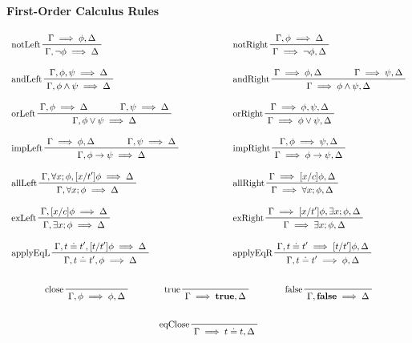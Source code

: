 			\paragraph{First-Order Calculus Rules}
				\begin{gather*}
					\begin{array}{lcl}
						\prftree[l]{notLeft}{\Gamma \implies \phi, \Delta}{\Gamma, \lnot\phi \implies \Delta} &\quad\quad\quad\quad& \prftree[l]{notRight}{\Gamma, \phi \implies \Delta}{\Gamma \implies \lnot\phi, \Delta} \\\\
						\prftree[l]{andLeft}{\Gamma, \phi, \psi \implies \Delta}{\Gamma, \phi \land \psi \implies \Delta} && \prftree[l]{andRight}{\Gamma \implies \phi, \Delta}{\qquad}{\Gamma \implies \psi, \Delta}{\Gamma \implies \phi \land \psi, \Delta} \\\\
						\prftree[l]{orLeft}{\Gamma, \phi \implies \Delta}{\qquad}{\Gamma, \psi \implies \Delta}{\Gamma, \phi \lor \psi \implies \Delta} && \prftree[l]{orRight}{\Gamma \implies \phi, \psi, \Delta}{\Gamma \implies \phi \lor \psi, \Delta} \\\\
						\prftree[l]{impLeft}{\Gamma \implies \phi, \Delta}{\qquad}{\Gamma, \psi \implies \Delta}{\Gamma, \phi \to \psi \implies \Delta} && \prftree[l]{impRight}{\Gamma, \phi \implies \psi, \Delta}{\Gamma \implies \phi \to \psi, \Delta} \\\\
						\prftree[l]{allLeft}{\Gamma, \forall x; \phi, [x/t']\phi \implies \Delta}{\Gamma, \forall x; \phi \implies \Delta} && \prftree[l]{allRight}{\Gamma \implies [x/c]\phi, \Delta}{\Gamma \implies \forall x; \phi, \Delta} \\\\
						\prftree[l]{exLeft}{\Gamma, [x/c]\phi \implies \Delta}{\Gamma, \exists x; \phi \implies \Delta} && \prftree[l]{exRight}{\Gamma \implies [x/t']\phi, \exists x; \phi, \Delta}{\Gamma \implies \exists x; \phi, \Delta} \\\\
						\prftree[l]{applyEqL}{\Gamma, t \doteq t', [t/t']\phi \implies \Delta}{\Gamma, t \doteq t', \phi \implies \Delta} && \prftree[l]{applyEqR}{\Gamma, t \doteq t' \implies [t/t']\phi, \Delta}{\Gamma, t \doteq t' \implies \phi, \Delta}
					\end{array} \\\\
					\prftree[l]{close}{\Gamma, \phi \implies \phi, \Delta} \quad\quad\quad\quad \prftree[l]{true}{\Gamma \implies \textbf{true}, \Delta} \quad\quad\quad\quad \prftree[l]{false}{\Gamma, \textbf{false} \implies \Delta} \\\\
					\prftree[l]{eqClose}{\Gamma \implies t \doteq t, \Delta}
				\end{gather*}

